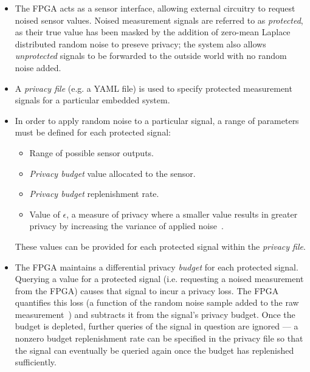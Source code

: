 \documentclass[12pt]{article}
\begin{document}
    \begin{itemize}
      \item The FPGA acts as a sensor interface, allowing external circuitry to request noised sensor values. Noised measurement signals are referred to as \textit{protected}, as their true value has been masked by the addition of zero-mean Laplace distributed random noise to preseve privacy; the system also allows \textit{unprotected} signals to be forwarded to the outside world with no random noise added. %
      \item A \textit{privacy file} (e.g. a YAML file) is used to specify protected measurement signals for a particular embedded system.
      \item In order to apply random noise to a particular signal, a range of parameters must be defined for each protected signal:
      \begin{itemize}
        \item Range of possible sensor outputs.
        \item \textit{Privacy budget} value allocated to the sensor.
        \item \textit{Privacy budget} replenishment rate.
        \item Value of $\epsilon$, a measure of privacy where a smaller value results in greater privacy by increasing the variance of applied noise~\cite{Choi2018GuaranteeingLD}.
      \end{itemize}
      These values can be provided for each protected signal within the \textit{privacy file}.
      \item The FPGA maintains a differential privacy \textit{budget} for each protected signal. Querying a value for a protected signal (i.e. requesting a noised measurement from the FPGA) causes that signal to incur a privacy loss. The FPGA quantifies this loss (a function of the random noise sample added to the raw measurement~\cite{Choi2018GuaranteeingLD}) and subtracts it from the signal's privacy budget. Once the budget is depleted, further queries of the signal in question are ignored --- a nonzero budget replenishment rate can be specified in the privacy file so that the signal can eventually be queried again once the budget has replenished sufficiently.

\end{itemize}
\end{document}
